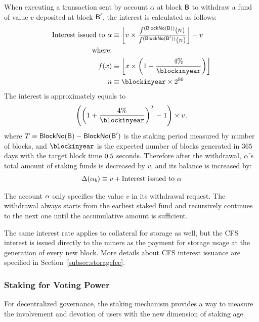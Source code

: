 When executing a transaction sent by account $\alpha$ at block $\textsf{B}$ to withdraw a fund of value $v$ deposited at block $\textsf{B}'$,
the interest is calculated as follows:
\begin{align}
	\text{Interest issued to $\account$} 
	&\eqdef \left\lfloor v \times \frac{f^{(\blockno(\block))}(n)}{f^{(\blockno(\block'))}(n)} \right\rfloor- v \\ 
	\mbox{where:}& \\
	f(x) &\eqdef \left\lfloor x \times \left(1+\frac{\interest}{\blockinyear}\right)\right\rfloor \\
	n &\eqdef \blockinyear \times 2^{80}
\end{align}
The interest is approximately equals to 
\begin{align}
	\left(\left(1+\frac{\interest}{\blockinyear}\right)^T-1\right)\times v, 
\end{align}
where $T\equiv\mathsf{BlockNo}(\textsf{B}) - \mathsf{BlockNo}(\textsf{B}')$ is the staking period measured by number of blocks, 
and $\blockinyear$ is the expected number of blocks generated in $365$ days with the target block time $0.5$ seconds.
% 
Therefore after the withdrawal, $\mathbf{\alpha}$'s total amount of staking funds is decreased by $v$,
and its balance is increased by:
\begin{align}
	\Delta(\mathbf{\alpha}_b) \equiv v + \text{Interest issued to $\mathbf{\alpha}$} 
\end{align}

The account $\mathbf{\alpha}$ only specifies the value $v$ in its withdrawal request. 
The withdrawal always starts from the earliest staked fund and recursively continues to the next one until the accumulative amount is sufficient.

The same interest rate applies to collateral for storage as well, but the CFS interest is issued directly to the miners as the payment for storage usage at the generation of every new block.
More details about CFS interest issuance are specified in Section~\ref{subsec:storagefee}.


\subsubsection{Staking for Voting Power}

For decentralized governance, the staking mechanism provides a way to measure the involvement and devotion of users with the new dimension of staking age.

